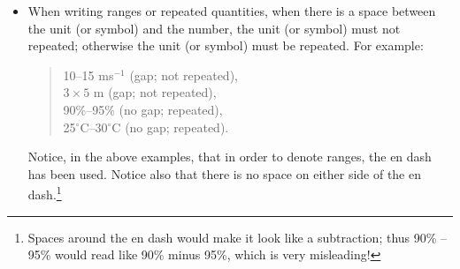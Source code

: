 \begin{itemize}
\item When writing ranges or repeated quantities, when there is a space between the unit (or symbol) and the number, the unit (or symbol) must not repeated; otherwise the unit (or symbol) must be repeated. For example:
\begin{quote}
10--15 ms$^{-1}$ \quad {} (gap; not repeated), \\
$3 \times 5$ m \quad {} (gap; not repeated), \\
90\%--95\% \quad {} (no gap; repeated), \\
25$^\circ$C--30$^\circ$C \quad {} (no gap; repeated).
\end{quote}
Notice, in the above examples, that in order to denote ranges, the en dash  has been used. Notice also that there is no space on either side of the en dash.\footnote{Spaces around the en dash would make it look like a subtraction; thus 90\% -- 95\% would read like 90\% minus 95\%, which is very misleading!}

\end{itemize}


